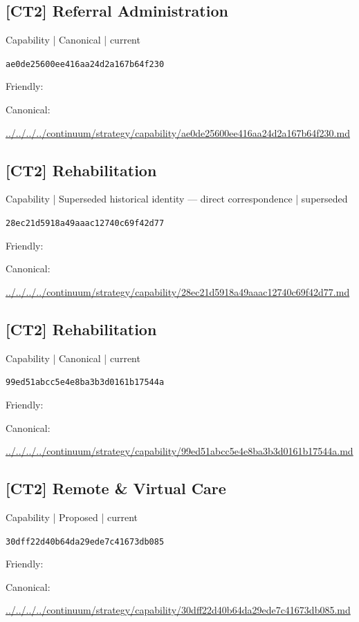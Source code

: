 \documentclass[10pt,a4paper]{article}
\begin{document}
\subsection*{[CT2] Referral Administration}
{\small Capability | Canonical | current}\par
\texttt{ae0de25600ee416aa24d2a167b64f230}\par
Friendly: \par
Canonical: \par
{\footnotesize\url{../../../../continuum/strategy/capability/ae0de25600ee416aa24d2a167b64f230.md}}\par
\subsection*{[CT2] Rehabilitation}
{\small Capability | Superseded historical identity — direct correspondence | superseded}\par
\texttt{28ec21d5918a49aaac12740c69f42d77}\par
Friendly: \par
Canonical: \par
{\footnotesize\url{../../../../continuum/strategy/capability/28ec21d5918a49aaac12740c69f42d77.md}}\par
\subsection*{[CT2] Rehabilitation}
{\small Capability | Canonical | current}\par
\texttt{99ed51abcc5e4e8ba3b3d0161b17544a}\par
Friendly: \par
Canonical: \par
{\footnotesize\url{../../../../continuum/strategy/capability/99ed51abcc5e4e8ba3b3d0161b17544a.md}}\par
\subsection*{[CT2] Remote \& Virtual Care}
{\small Capability | Proposed | current}\par
\texttt{30dff22d40b64da29ede7c41673db085}\par
Friendly: \par
Canonical: \par
{\footnotesize\url{../../../../continuum/strategy/capability/30dff22d40b64da29ede7c41673db085.md}}\par
\end{document}
